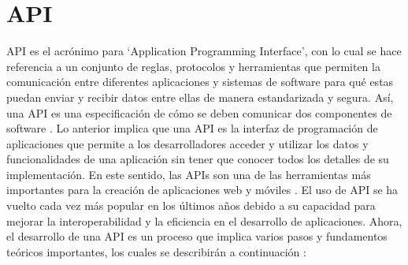 \section{API}
API es el acrónimo para ‘Application Programming Interface’, con lo cual se hace referencia a un conjunto de reglas, protocolos y herramientas que permiten la comunicación entre diferentes aplicaciones y sistemas de software \cite{art:architectural_styles} para qué estas puedan enviar y recibir datos entre ellas de manera estandarizada y segura. Así, una API es una especificación de cómo se deben comunicar dos componentes de software \cite{book:restful_webservices_allamaraju}. Lo anterior implica que una API es la interfaz de programación de aplicaciones que permite a los desarrolladores acceder y utilizar los datos y funcionalidades de una aplicación sin tener que conocer todos los detalles de su implementación.
En este sentido, las APIs son una de las herramientas más importantes para la creación de aplicaciones web y móviles \cite{art:designing_web_api}. El uso de API se ha vuelto cada vez más popular en los últimos años debido a su capacidad para mejorar la interoperabilidad y la eficiencia en el desarrollo de aplicaciones. Ahora, el desarrollo de una API es un proceso que implica varios pasos y fundamentos teóricos importantes, los cuales se describirán a continuación \cite{art:architectural_styles}:

